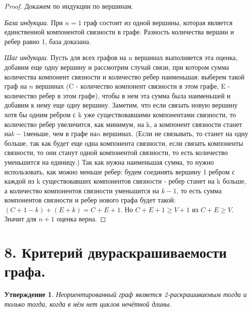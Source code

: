 \documentclass[a4paper,12pt]{article}
\newtheorem*{Statements}{Утверждение}
\begin{document}
    \begin{proof}
        Докажем по индукции по вершинам. 
        
        \textit{База индукции}. При $n = 1$ граф состоит из одной вершины, которая является единственной компонентой связности в графе. Разность количества вершин и ребер равно 1, база доказана.
        
        \textit{Шаг индукции}. Пусть для всех графов на n вершинах выполняется эта оценка, добавим еще одну вершину и рассмотрим случай связи, при котором сумма количества компонент
        связности и количество ребер наименьшая: выберем такой граф на $n$ вершинах (C - количество
        компонент связности в этом графе, E - количество ребер в этом графе), чтобы в нем эта сумма
        была наименьшей и добавим к нему еще одну вершину. Заметим, что если связать новую вершину
        хотя бы одним ребром с k уже существовавшими компонентами связности, то количество ребер
        увеличится, как минимум, на k, а компонент связности станет на$ k - 1 $меньше, чем в графе на$ n$
        вершинах. (Если не связывать, то станет на одну больше, так как будет еще одна компонента
        связности, если связать компоненты связности, то они станут одной компонентой связности, то
        есть количество уменьшится на единицу.) Так как нужна наименьшая сумма, то нужно
        использовать, как можно меньше ребер: будем соединять вершину 1 ребром с каждой из k существовавших компонентов связности - ребер станет на k больше, а количество компонентов
        связности уменьшится на $k - 1$, то есть сумма компонентов связности и ребер нового графа будет
        такой: $(C + 1 - k) + (E + k) = C + E + 1$. Но $ C + E + 1 \geq V + 1 $ из $ C + E \geq V$. Значит для $n + 1$      оценка верна.
    \end{proof}
    
    \section*{8. Критерий двураскрашиваемости графа.}
    \begin{Statements}
        Неориентированный граф является 2-раскрашиваемым тогда и только тогда,
        когда в нём нет циклов нечётной длины.
    \end{Statements}
\end{document}
